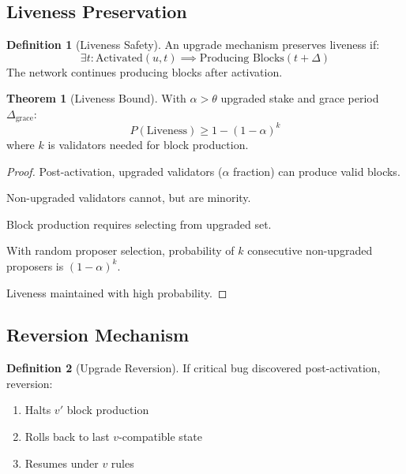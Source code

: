 \documentclass[11pt,a4paper]{article}
\theoremstyle{definition}
\newtheorem{definition}{Definition}[section]
\newtheorem{theorem}{Theorem}[section]
\theoremstyle{remark}
\begin{document}
\subsection{Liveness Preservation}

\begin{definition}[Liveness Safety]
An upgrade mechanism preserves liveness if:
\begin{equation}
    \exists t: \text{Activated}(u, t) \implies \text{Producing Blocks}(t + \Delta)
\end{equation}
The network continues producing blocks after activation.
\end{definition}

\begin{theorem}[Liveness Bound]
With $\alpha > \theta$ upgraded stake and grace period $\Delta_{\text{grace}}$:
\begin{equation}
    P(\text{Liveness}) \geq 1 - (1 - \alpha)^{k}
\end{equation}
where $k$ is validators needed for block production.
\end{theorem}

\begin{proof}
Post-activation, upgraded validators ($\alpha$ fraction) can produce valid blocks.

Non-upgraded validators cannot, but are minority.

Block production requires selecting from upgraded set.

With random proposer selection, probability of $k$ consecutive non-upgraded proposers is $(1-\alpha)^k$.

Liveness maintained with high probability.
\end{proof}

\subsection{Reversion Mechanism}

\begin{definition}[Upgrade Reversion]
If critical bug discovered post-activation, reversion:
\begin{enumerate}
    \item Halts $v'$ block production
    \item Rolls back to last $v$-compatible state
    \item Resumes under $v$ rules
\end{enumerate}
\end{definition}
\end{document}
